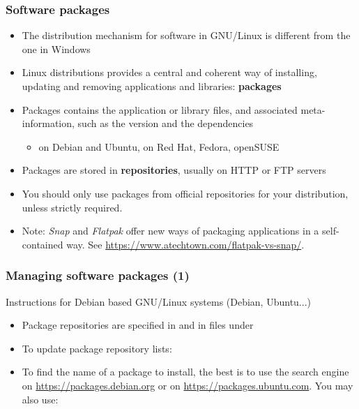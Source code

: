\begin{frame}
  \frametitle{Software packages}
  \begin{itemize}
  \item The distribution mechanism for software in GNU/Linux is
    different from the one in Windows
  \item Linux distributions provides a central and coherent way of
    installing, updating and removing applications and libraries:
    {\bf packages}
  \item Packages contains the application or library files, and
    associated meta-information, such as the version and the
    dependencies
    \begin{itemize}
    \item {} on Debian and Ubuntu,  on Red Hat,
      Fedora, openSUSE
    \end{itemize}
  \item Packages are stored in {\bf repositories}, usually on HTTP or
    FTP servers
  \item You should only use packages from official repositories for your
    distribution, unless strictly required.
  \item Note: {\em Snap} and {\em Flatpak} offer new ways of packaging
    applications in a self-contained way. See
    \url{https://www.atechtown.com/flatpak-vs-snap/}.

\end{itemize}
\end{frame}

\begin{frame}
  \frametitle{Managing software packages (1)}
  Instructions for Debian based GNU/Linux systems (Debian, Ubuntu...)
  \begin{itemize}
  \item Package repositories are specified in 
	and in files under 
  \item To update package repository lists:\\
  \item To find the name of a package to install, the best is to use
    the search engine on \url{https://packages.debian.org} or on
    \url{https://packages.ubuntu.com}. You may
    also use:\\
  \end{itemize}
\end{frame}

